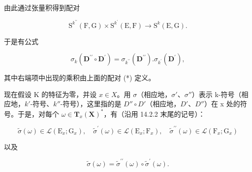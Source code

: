 由此通过张量积得到配对

\[
\mathrm{S} ^ {k ^ {\prime \prime}} (\mathrm{F}, \mathrm{G}) \times \mathrm{S} ^ {k ^ {\prime}} (\mathrm{E}, \mathrm{F}) \rightarrow \mathrm{S} ^ {k} (\mathrm{E}, \mathrm{G}).\tag{*}
\]

于是有公式

\[
\sigma_ {k} (\mathbf {D} ^ {\prime \prime} \circ \mathbf {D} ^ {\prime}) = \sigma_ {k ^ {\prime \prime}} (\mathbf {D} ^ {\prime \prime}). \sigma_ {k ^ {\prime}} (\mathbf {D} ^ {\prime}),
\]

其中右端项中出现的乘积由上面的配对 (*) 定义。

现在假设 K 的特征为零，并设 \(x \in X\)。用 \(\sigma\)（相应地，\(\sigma'\)、\(\sigma''\)）表示 k-符号（相应地，\(k'\)-符号、\(k''\)-符号），这里指的是 \(D'' \circ D'\)（相应地，\(D'\)、\(D''\)）在 x 处的符号。于是，对每个 \(\omega \in \mathbf{T}_{x}(\mathbf{X})^{*}\)，有（沿用 14.2.2 末尾的记号）：

\[
\tilde {\sigma} (\omega) \in \mathscr {L} (\mathrm{E} _ {x}; \mathrm{G} _ {x}), \quad \tilde {\sigma} ^ {\prime} (\omega) \in \mathscr {L} (\mathrm{E} _ {x}; \mathrm{F} _ {x}), \quad \tilde {\sigma} ^ {\prime \prime} (\omega) \in \mathscr {L} (\mathrm{F} _ {x}; \mathrm{G} _ {x})
\]

以及

\[
\tilde {\sigma} (\omega) = \tilde {\sigma} ^ {\prime \prime} (\omega) \circ \tilde {\sigma} ^ {\prime} (\omega).
\]


